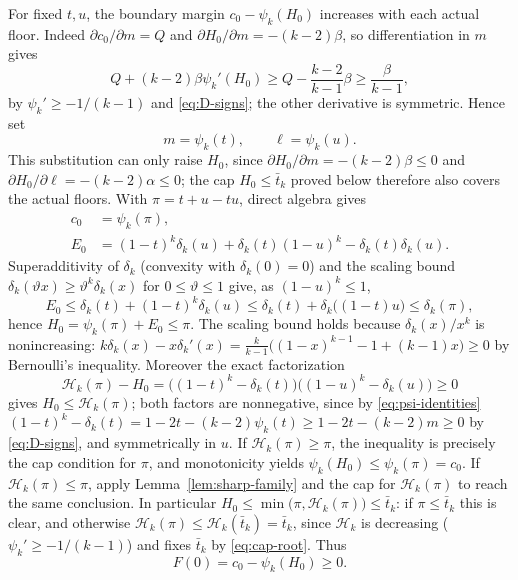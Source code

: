 \documentclass[11pt]{article}
\theoremstyle{definition}
\theoremstyle{remark}
\begin{document}
For fixed $t,u$, the boundary margin $c_0-\psi_k(H_0)$ increases with
each actual floor.  Indeed $\partial c_0/\partial m=Q$ and
$\partial H_0/\partial m=-(k-2)\beta$, so differentiation in $m$ gives
\[
 Q+(k-2)\beta\psi_k'(H_0)
 \ge Q-\frac{k-2}{k-1}\beta\ge\frac\beta{k-1},
\]
by $\psi_k'\ge-1/(k-1)$ and \eqref{eq:D-signs}; the other derivative is
symmetric.  Hence set
\begin{equation}\label{eq:D-floor-equality}
 m=\psi_k(t),\qquad \ell=\psi_k(u).
\end{equation}
This substitution can only raise $H_0$, since
$\partial H_0/\partial m=-(k-2)\beta\le0$ and
$\partial H_0/\partial\ell=-(k-2)\alpha\le0$; the cap
$H_0\le\bar t_k$ proved below therefore also covers the actual floors.
With $\pi=t+u-tu$, direct algebra gives
\begin{align}
 c_0&=\psi_k(\pi),\label{eq:D-c0}\\
 E_0&=(1-t)^k\delta_k(u)+\delta_k(t)(1-u)^k
      -\delta_k(t)\delta_k(u).\label{eq:D-E0}
\end{align}
Superadditivity of $\delta_k$ (convexity with $\delta_k(0)=0$) and the
scaling bound $\delta_k(\vartheta x)\ge\vartheta^k\delta_k(x)$ for
$0\le\vartheta\le1$ give, as $(1-u)^k\le1$,
\[
 E_0\le\delta_k(t)+(1-t)^k\delta_k(u)
 \le\delta_k(t)+\delta_k\bigl((1-t)u\bigr)\le\delta_k(\pi),
\]
hence $H_0=\psi_k(\pi)+E_0\le\pi$.  The scaling bound holds because
$\delta_k(x)/x^k$ is nonincreasing:
$k\delta_k(x)-x\delta_k'(x)
=\tfrac k{k-1}\bigl((1-x)^{k-1}-1+(k-1)x\bigr)\ge0$
by Bernoulli's inequality.
Moreover the exact factorization
\begin{equation}\label{eq:D-H-factor}
 \mathcal H_k(\pi)-H_0
 =\bigl((1-t)^k-\delta_k(t)\bigr)
  \bigl((1-u)^k-\delta_k(u)\bigr)\ge0
\end{equation}
gives $H_0\le\mathcal H_k(\pi)$; both factors are nonnegative, since by
\eqref{eq:psi-identities}
$(1-t)^k-\delta_k(t)=1-2t-(k-2)\psi_k(t)\ge1-2t-(k-2)m\ge0$
by \eqref{eq:D-signs}, and symmetrically in $u$.
If $\mathcal H_k(\pi)\ge\pi$, the
inequality is precisely the cap condition for $\pi$, and monotonicity
yields $\psi_k(H_0)\le\psi_k(\pi)=c_0$.  If $\mathcal H_k(\pi)\le\pi$,
apply Lemma~\ref{lem:sharp-family} and the cap for $\mathcal H_k(\pi)$
to reach the same conclusion.  In particular
$H_0\le\min\bigl(\pi,\mathcal H_k(\pi)\bigr)\le\bar t_k$: if
$\pi\le\bar t_k$ this is clear, and otherwise
$\mathcal H_k(\pi)\le\mathcal H_k(\bar t_k)=\bar t_k$, since
$\mathcal H_k$ is decreasing ($\psi_k'\ge-1/(k-1)$) and fixes
$\bar t_k$ by \eqref{eq:cap-root}.  Thus
\begin{equation}\label{eq:D-F0}
 F(0)=c_0-\psi_k(H_0)\ge0.
\end{equation}
\end{document}
